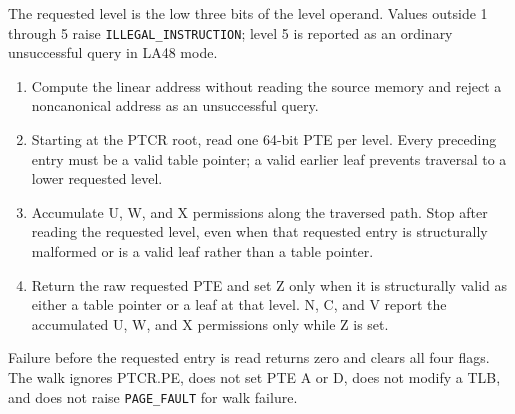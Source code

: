 The requested level is the low three bits of the level operand. Values outside 1 through 5 raise \texttt{ILLEGAL\_INSTRUCTION}; level 5 is reported as an ordinary unsuccessful query in LA48 mode.

\begin{enumerate}
\item Compute the linear address without reading the source memory and reject a noncanonical address as an unsuccessful query.
\item Starting at the PTCR root, read one 64-bit PTE per level. Every preceding entry must be a valid table pointer; a valid earlier leaf prevents traversal to a lower requested level.
\item Accumulate U, W, and X permissions along the traversed path. Stop after reading the requested level, even when that requested entry is structurally malformed or is a valid leaf rather than a table pointer.
\item Return the raw requested PTE and set Z only when it is structurally valid as either a table pointer or a leaf at that level. N, C, and V report the accumulated U, W, and X permissions only while Z is set.
\end{enumerate}
Failure before the requested entry is read returns zero and clears all four flags. The walk ignores PTCR.PE, does not set PTE A or D, does not modify a TLB, and does not raise \texttt{PAGE\_FAULT} for walk failure.
